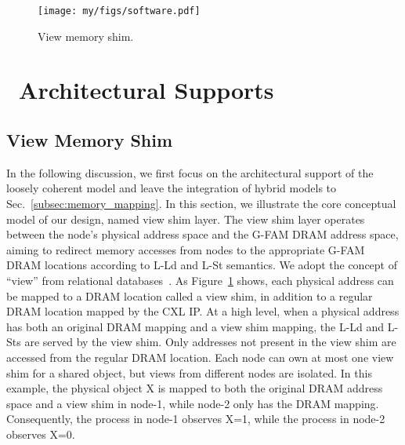 \begin{figure}[t]
  \centering
  \texttt{[image: my/figs/software.pdf]}
  \caption{View memory shim. }
  \label{fig:view_model}
\end{figure}

\section{\name~Architectural Supports}     \label{sec:details}

\subsection{View Memory Shim}   \label{subsec:vms}






In the following discussion, we first focus on the architectural support of the loosely coherent model and leave the integration of hybrid models to Sec.~\ref{subsec:memory_mapping}. 
In this section, we illustrate the core conceptual model of our design, named view shim layer. The view shim layer operates between the node's physical address space and the G-FAM DRAM address space, aiming to redirect memory accesses from nodes to the appropriate G-FAM DRAM locations according to L-Ld and L-St semantics. We adopt the concept of ``view'' from relational databases~\cite{mvc_micro23, pageoverlay_isca15, overlaytm_pact19}. 
As Figure~\ref{fig:view_model} shows, each physical address can be mapped to a DRAM location called a view shim, in addition to a regular DRAM location mapped by the CXL IP. At a high level, when a physical address has both an original DRAM mapping and a view shim mapping, the L-Ld and L-Sts are served by the view shim. Only addresses not present in the view shim are accessed from the regular DRAM location. 
Each node can own at most one view shim for a shared object, but views from different nodes are isolated. In this example, the physical object X is mapped to both the original DRAM address space and a view shim in node-1, while node-2 only has the DRAM mapping. Consequently, the process in node-1 observes X=1, while the process in node-2 observes X=0.



